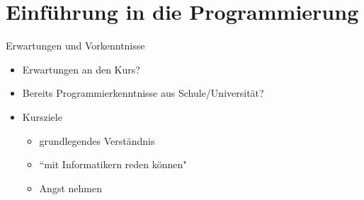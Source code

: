 \section{Einführung in die Programmierung}

\begin{frame}{Erwartungen und Vorkenntnisse}
    \begin{itemize}
        \item Erwartungen an den Kurs?
        \item Bereits Programmierkenntnisse aus Schule/Universität?
        \item Kursziele 
            \begin{itemize}
                \item grundlegendes Verständnis
                \item ``mit Informatikern reden können"
                \item Angst nehmen
            \end{itemize}
    \end{itemize}
\end{frame}

